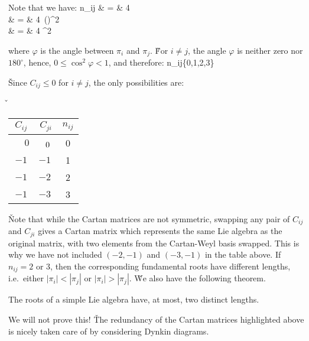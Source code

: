 Note that we have:
n_{ij} & = & 4\,\,
\\[5pt]
& = & 4\, \biggl(\biggr)^2\\[5pt]
& = & 4 \cos^2\varphi
\ei

where $\varphi$ is the angle between $\pi_i$ and $\pi_j$. \v

For $i\neq j$, the angle $\varphi$ is neither zero nor $180^\circ$, hence, $0\leq \cos^2\varphi< 1$, and therefore:
\bse
n_{ij}\in \{0,1,2,3\}
\ese

\v

Since $C_{ij}\leq 0$ for $i\neq j$, the only possibilities are:

\v

\begin{center}
\begin{tabular}{ cc | c}
$C_{ij}$ & $C_{ji}$ & $n_{ij}$\\[2pt]
\hline
$\phantom{-}0$ & $\phantom{-}0\rule{0pt}{13pt}\ $ & 0 \\
$-1$ & $-1\ $ & 1 \\
$-1$ & $-2\ $ & 2 \\
$-1$ & $-3\ $ & 3
\end{tabular}
\end{center}

\v

Note that while the Cartan matrices are not symmetric, swapping any pair of $C_{ij}$ and $C_{ji}$ gives a Cartan
matrix which represents the same Lie algebra as the original matrix, with two elements from the Cartan-Weyl basis
swapped. This is why we have not included $(-2,-1)$ and $(-3,-1)$ in the table above. If $n_{ij}= 2$ or $3$, then the
corresponding fundamental roots have different lengths, i.e.\ either $|\pi_i|<|\pi_j|$ or $|\pi_i|>|\pi_j|$. \v

We also have the following theorem.

\bt[]
The roots of a simple Lie algebra have, at most, two distinct lengths.
\et

We will not prove this! \v

The redundancy of the Cartan matrices highlighted above is nicely taken care of by considering Dynkin diagrams.

